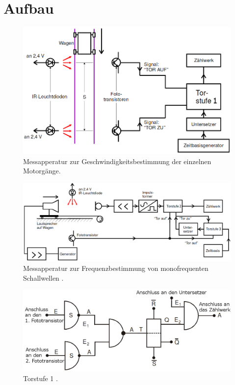 \section{Aufbau}
\label{sec:Aufbau}
\begin{figure}
	\centering
	\includegraphics[width=\linewidth-50pt,height=\textheight-50pt,keepaspectratio]{content/Bilder/Geschwindigkeitsmessung.png}
	\caption{Messapperatur zur Geschwindigkeitsbestimmung der einzelnen Motorgänge\cite{V104}.}
	\label{fig:Aufbau}
\end{figure}
\begin{figure}
	\centering
	\includegraphics[width=\linewidth-50pt,height=\textheight-50pt,keepaspectratio]{content/Bilder/Frequenzmessung.png}
	\caption{Messapperatur zur Frequenzbestimmung von monofrequenten Schallwellen \cite{V104}.}
	\label{fig:Aufbau}
\end{figure}
\begin{figure}
	\centering
	\includegraphics[width=\linewidth-50pt,height=\textheight-50pt,keepaspectratio]{content/Bilder/Torstufe1.png}
	\caption{Torstufe 1 \cite{V104}.}
	\label{fig:Aufbau}
\end{figure}
